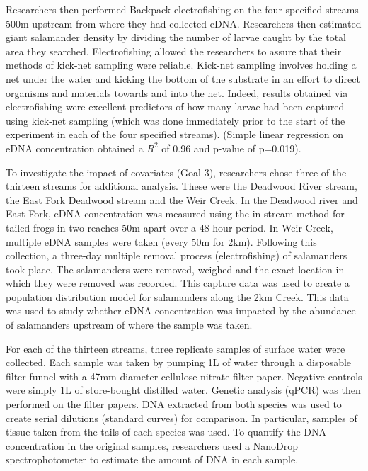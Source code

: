 \vspace{5mm}

Researchers then performed Backpack electrofishing on the four specified streams 500m upstream from where they had collected eDNA. Researchers then estimated giant salamander density by dividing the number of larvae caught by the total area they searched. Electrofishing allowed the researchers to assure that their methods of kick-net sampling were reliable. Kick-net sampling involves holding a net under the water and kicking the bottom of the substrate in an effort to direct organisms and materials towards and into the net. Indeed, results obtained via electrofishing were excellent predictors of how many larvae had been captured using kick-net sampling (which was done immediately prior to the start of the experiment in each of the four specified streams). (Simple linear regression on eDNA concentration obtained a $R^{2}$ of 0.96 and p-value of p=0.019).


\vspace{5mm}


To investigate the impact of covariates (Goal 3), researchers chose three of the thirteen streams for additional analysis. These were the Deadwood River stream, the East Fork Deadwood stream and the Weir Creek. In the Deadwood river and East Fork, eDNA concentration was measured using the in-stream method for tailed frogs in two reaches 50m apart over a 48-hour period. In Weir Creek, multiple eDNA samples were taken (every 50m for 2km). Following this collection, a three-day multiple removal process (electrofishing) of salamanders took place. The salamanders were removed, weighed and the exact location in which they were removed was recorded. This capture data was used to create a population distribution model for salamanders along the 2km Creek. This data was used to study whether eDNA concentration was impacted by the abundance of salamanders upstream of where the sample was taken.


\vspace{5mm}

For each of the thirteen streams, three replicate samples of surface water were collected. Each sample was taken by pumping 1L of water through a disposable filter funnel with a 47mm diameter cellulose nitrate filter paper. Negative controls were simply 1L of store-bought distilled water. Genetic analysis (qPCR) was then performed on the filter papers. DNA extracted from both species was used to create serial dilutions (standard curves) for comparison. In particular, samples of tissue taken from the tails of each species was used. To quantify the DNA concentration in the
original samples, researchers used a NanoDrop spectrophotometer to estimate the amount of DNA in each sample.


